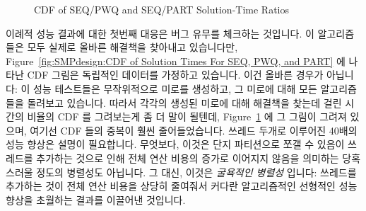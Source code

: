 \begin{figure}[tb]
\begin{center}
\end{center}
\caption{CDF of SEQ/PWQ and SEQ/PART Solution-Time Ratios}
\label{fig:SMPdesign:CDF of SEQ/PWQ and SEQ/PART Solution-Time Ratios}
\end{figure}

이례적 성능 결과에 대한 첫번째 대응은 버그 유무를 체크하는 것입니다.
이 알고리즘들은 모두 실제로 올바른 해결책을 찾아내고 있습니다만,
Figure~\ref{fig:SMPdesign:CDF of Solution Times For SEQ, PWQ, and PART} 에
나타난 CDF 그림은 독립적인 데이터를 가정하고 있습니다.
이건 올바른 경우가 아닙니다:  이 성능 테스트들은 무작위적으로 미로를 생성하고,
그 미로에 대해 모든 알고리즘들을 돌려보고 있습니다.
따라서 각각의 생성된 미로에 대해 해결책을 찾는데 걸린 시간의 비율의 CDF 를
그려보는게 좀 더 말이 될텐데,
Figure~\ref{fig:SMPdesign:CDF of SEQ/PWQ and SEQ/PART Solution-Time Ratios} 에
그 그림이 그려져 있으며, 여기선 CDF 들의 중복이 훨씬 줄어들었습니다.
쓰레드 두개로 이루어진 40배의 성능 향상은 설명이 필요합니다.
무엇보다, 이것은 단지 파티션으로 쪼갤 수 있음이 쓰레드를 추가하는 것으로 인해
전체 연산 비용의 증가로 이어지지 않음을 의미하는 당혹스러울 정도의 병렬성도
아닙니다.
그 대신, 이것은 \emph{굴욕적인 병렬성} 입니다: 쓰레드를 추가하는 것이 전체 연산
비용을 상당히 줄여줘서 커다란 알고리즘적인 선형적인 성능향상을 초월하는 결과를
이끌어낸 것입니다. 
\iffalse

